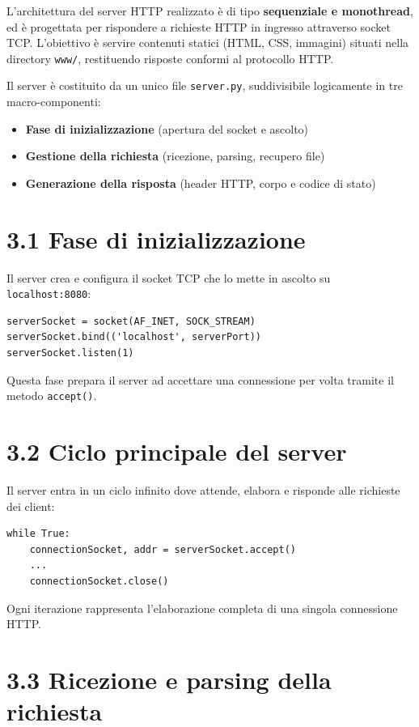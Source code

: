 \documentclass[a4paper,12pt]{report}
\begin{document}
L'architettura del server HTTP realizzato è di tipo \textbf{sequenziale e monothread}, ed è progettata per rispondere a richieste HTTP in ingresso attraverso socket TCP. L'obiettivo è servire contenuti statici (HTML, CSS, immagini) situati nella directory \texttt{www/}, restituendo risposte conformi al protocollo HTTP.

Il server è costituito da un unico file \texttt{server.py}, suddivisibile logicamente in tre macro-componenti:
\begin{itemize}
    \item \textbf{Fase di inizializzazione} (apertura del socket e ascolto)
    \item \textbf{Gestione della richiesta} (ricezione, parsing, recupero file)
    \item \textbf{Generazione della risposta} (header HTTP, corpo e codice di stato)
\end{itemize}

\section{3.1 Fase di inizializzazione}

Il server crea e configura il socket TCP che lo mette in ascolto su \texttt{localhost:8080}:

\begin{verbatim}
serverSocket = socket(AF_INET, SOCK_STREAM)
serverSocket.bind(('localhost', serverPort))
serverSocket.listen(1)
\end{verbatim}

Questa fase prepara il server ad accettare una connessione per volta tramite il metodo \texttt{accept()}.

\newpage

\section{3.2 Ciclo principale del server}

Il server entra in un ciclo infinito dove attende, elabora e risponde alle richieste dei client:

\begin{verbatim}
while True:
    connectionSocket, addr = serverSocket.accept()
    ...
    connectionSocket.close()
\end{verbatim}

Ogni iterazione rappresenta l’elaborazione completa di una singola connessione HTTP.


\section{3.3 Ricezione e parsing della richiesta}
\end{document}
